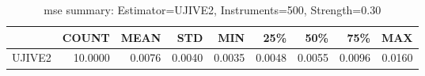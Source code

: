 \begin{table}[ht]
\centering
\caption{mse summary: Estimator=UJIVE2, Instruments=500, Strength=0.30}
\begin{tabular}{lrrrrrrrr}
\toprule
 & COUNT & MEAN & STD & MIN & 25\% & 50\% & 75\% & MAX \\
\midrule
UJIVE2 & 10.0000 & 0.0076 & 0.0040 & 0.0035 & 0.0048 & 0.0055 & 0.0096 & 0.0160 \\
\bottomrule
\end{tabular}
\end{table}
